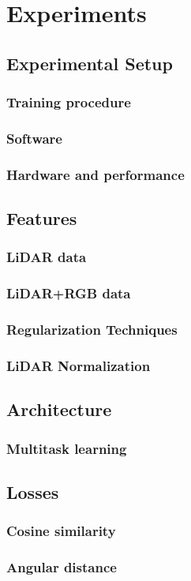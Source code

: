 \chapter{Experiments}%
\label{sec:experiments}

\section{Experimental Setup}
\subsection{Training procedure}
\subsection{Software}
\subsection{Hardware and performance}

\section{Features}
\subsection{LiDAR data}
\subsection{LiDAR+RGB data}

\subsection{Regularization Techniques}%
\label{sec:technique-experiments}


\subsection{LiDAR Normalization}%
\label{sec:normalization-experiment}


\section{Architecture}
\subsection{Multitask learning}

\section{Losses}
\subsection{Cosine similarity}
\subsection{Angular distance}
